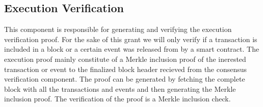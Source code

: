 \subsection{Execution Verification}
This component is responsible for generating and verifying the execution verification proof. For the sake 
of this grant we will only verify if a transaction is included in a block or a certain event was released 
from by a smart contract. The execution proof mainly constitute of a Merkle inclusion proof of the inerested 
transaction or event to the finalized block header recieved from the consensus verification component. The 
proof can be generated by fetching the complete block with all the transactions and events and then generating 
the Merkle inclusion proof. The verification of the proof is a Merkle inclusion check. 

